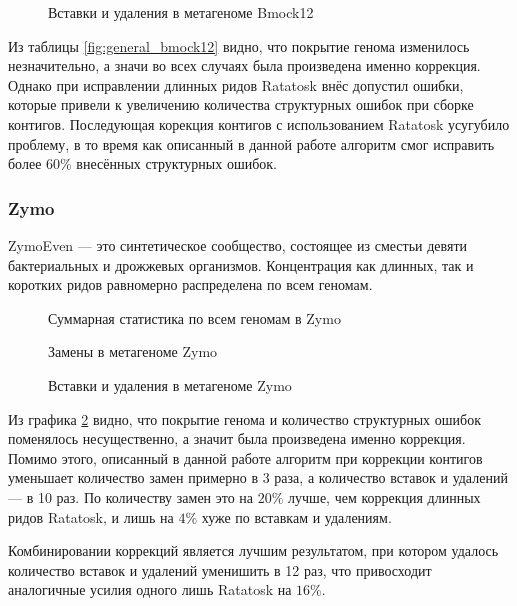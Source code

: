 \documentclass[14pt]{matmex-diploma-custom}
\begin{document}
\begin{figure}[h!]
    \centering
    
    \caption{Вставки и удаления в метагеноме Bmock12}
    \label{fig:indels_bmock12}
\end{figure}

Из таблицы \ref{fig:general_bmock12} видно, что покрытие генома изменилось незначительно, а значи во всех случаях была произведена именно коррекция. Однако при исправлении длинных ридов Ratatosk внёс допустил ошибки, которые привели к увеличению количества структурных ошибок при сборке контигов. Последующая корекция контигов с использованием Ratatosk усугубило проблему, в то время как описанный в данной работе алгоритм смог исправить более $60\%$ внесённых структурных ошибок.

\subsubsection*{Zymo}
ZymoEven --- это синтетическое сообщество, состоящее из сместьи  девяти бактериальных и дрожжевых организмов. Концентрация как длинных, так и коротких ридов равномерно распределена по всем геномам.

\begin{figure}[h!]
    \centering
    
    \caption{Суммарная статистика по всем геномам в Zymo}
    \label{fig:general_zymo}
\end{figure}

\begin{figure}[h!]
    \centering
    
    \caption{Замены в метагеноме Zymo}
    \label{fig:mismatches_zymo}
\end{figure}

\begin{figure}[h!]
    \centering
    
    \caption{Вставки и удаления в метагеноме Zymo}
    \label{fig:indels_zymo}
\end{figure}

Из графика \ref{fig:general_zymo} видно, что покрытие генома и количество структурных ошибок поменялось несущественно, а значит была произведена именно коррекция. Помимо этого, описанный в данной работе алгоритм при коррекции контигов уменьшает количество замен примерно в 3 раза, а количество вставок и удалений --- в 10 раз. По количеству замен это на $20\%$ лучше, чем коррекция длинных ридов Ratatosk, и лишь на $4\%$ хуже по вставкам и удалениям.

Комбинировании коррекций является лучшим результатом, при котором удалось количество вставок и удалений уменишить в 12 раз, что привосходит аналогичные усилия одного лишь Ratatosk на $16\%$.
\end{document}
